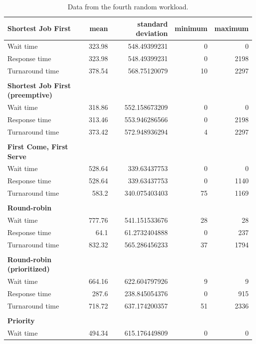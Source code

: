 \documentclass[12pt,letterpaper]{article}
\begin{document}
\begin{appendices}
			\begin{table}[H]
	 			\label{table:data-rand4}
	  			\caption{Data from the fourth random workload.}
		  		\begin{tabular}{l r r r r}
					\textbf{Shortest Job First} & mean & standard deviation & minimum & maximum\\
					\hline
					Wait time &		323.98 &	548.49399231 &	0 &	0 	\\
Response time &		323.98 &	548.49399231 &	0 &	2198 	\\
Turnaround time &	378.54 &	568.75120079 &	10 &	2297 	\\
					\\
					\textbf{Shortest Job First (preemptive)} \\
					\hline
					Wait time &		318.86 &	552.158673209 &	0 &	0 	\\
Response time &		313.46 &	553.946286566 &	0 &	2198 	\\
Turnaround time &	373.42 &	572.948936294 &	4 &	2297 	\\
					\\
					\textbf{First Come, First Serve} \\
					\hline
Wait time &		528.64 &	339.63437753 &	0 &	0 	\\
Response time &		528.64 &	339.63437753 &	0 &	1140 	\\
Turnaround time &	583.2 &	340.075403403 &	75 &	1169 	\\
					\\
					\textbf{Round-robin} \\
					\hline
					Wait time &		777.76 &	541.151533676 &	28 &	28 	\\
Response time &		64.1 &	61.2732404888 &	0 &	237 	\\
Turnaround time &	832.32 &	565.286456233 &	37 &	1794 	\\
					\\
					\textbf{Round-robin (prioritized)} \\
					\hline
					Wait time &		664.16 &	622.604797926 &	9 &	9 	\\
Response time &		287.6 &	238.845054376 &	0 &	915 	\\
Turnaround time &	718.72 &	637.174200357 &	51 &	2336 	\\
					\\
					\textbf{Priority} \\
					\hline
					Wait time &		494.34 &	615.176449809 &	0 &	0 	\\

\end{tabular}
\end{table}
\end{appendices}
\end{document}
